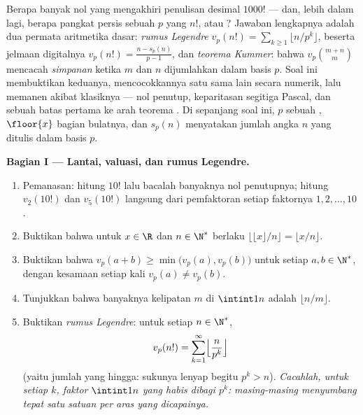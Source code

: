 \begin{problem}\label{pb:b1:arith:1}
Berapa banyak nol yang mengakhiri penulisan desimal $1000!$ --- dan, lebih dalam
lagi, berapa pangkat persis sebuah  $p$ yang  $n!$, atau 
? Jawaban lengkapnya adalah dua permata
aritmetika dasar: \emph{rumus Legendre}
 $v_p(n!) = \sum_{k\geq1}
\lfloor n/p^k \rfloor$, beserta jelmaan digitalnya $v_p(n!) = \frac{n
- s_p(n)}{p-1}$, dan \emph{teorema Kummer}: bahwa $v_p\binom{m+n}m$ mencacah \emph{simpanan} ketika
$m$ dan $n$ dijumlahkan dalam basis $p$. Soal ini membuktikan keduanya, mencocokkannya
satu sama lain secara numerik, lalu memanen akibat
klasiknya --- nol penutup, keparitasan segitiga Pascal,
dan sebuah batas pertama ke arah teorema .
Di sepanjang soal ini, $p$ sebuah , $\floor{x}$ bagian bulatnya, dan
$s_p(n)$ menyatakan jumlah angka $n$ yang ditulis dalam basis $p$.

\medskip
\noindent\textbf{Bagian I --- Lantai, valuasi, dan rumus
Legendre.}
\begin{enumerate}
  \item Pemanasan: hitung $10!$ lalu bacalah banyaknya nol penutupnya;
        hitung $v_2(10!)$ dan $v_5(10!)$ langsung dari
        pemfaktoran setiap faktornya $1, 2, \dots, 10$.
  \item Buktikan bahwa untuk $x \in \R$ dan $n \in \N^*$ berlaku
        $\bigl\lfloor \lfloor x \rfloor / n \bigr\rfloor =
        \lfloor x/n \rfloor$.
  \item Buktikan bahwa $v_p(a + b) \geq \min\bigl(v_p(a),
        v_p(b)\bigr)$ untuk setiap $a, b \in \N^*$, dengan kesamaan
        setiap kali $v_p(a) \neq v_p(b)$.
  \item Tunjukkan bahwa banyaknya kelipatan $m$ di $\intint1n$ adalah
        $\lfloor n/m \rfloor$.
  \item Buktikan \emph{rumus Legendre}: untuk setiap $n \in \N^*$,
        \[
        v_p(n!) = \sum_{k=1}^{\infty}
        \Bigl\lfloor \frac{n}{p^k} \Bigr\rfloor
        \]
        (yaitu jumlah yang hingga: sukunya lenyap begitu $p^k > n$).
        \emph{Cacahlah, untuk setiap $k$, faktor $\intint1n$ yang
        habis dibagi $p^k$: masing-masing menyumbang tepat satu satuan per
        aras yang dicapainya.}
\end{enumerate}


\end{problem}
